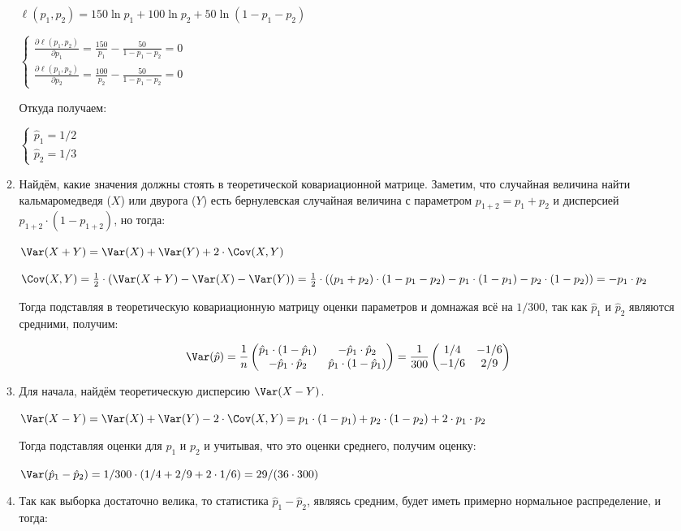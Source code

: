 \begin{enumerate}
\begin{enumerate}
$\ell(p_{1},p_{2}) = 150\ln p_{1} +100\ln p_{2}+50\ln (1-p_{1}-p_{2})$

$\begin{cases}
\frac{\partial \ell(p_{1},p_{2})}{\partial p_{1}}= \frac{150}{p_{1}} - \frac{50}{1-p_{1}-p_{2}}=0
\\
\frac{\partial \ell(p_{1},p_{2})}{\partial p_{2}}= \frac{100}{p_{2}} - \frac{50}{1-p_{1}-p_{2}}=0
\end{cases}$

Откуда получаем:

$\begin{cases}
\hat{p}_{1}=1/2
\\
\hat{p}_{2}=1/3
\end{cases}$
\item Найдём, какие значения должны стоять в теоретической ковариационной матрице.
Заметим, что случайная величина найти кальмаромедведя ($X$) или двурога ($Y$) есть бернулевская случайная величина с параметром $p_{1+2}=p_{1}+p_{2}$ и дисперсией $p_{1+2}\cdot(1-p_{1+2})$, но тогда:

$\Var(X + Y)=\Var(X)+\Var(Y)+2\cdot\Cov(X,Y)$

$\Cov(X,Y)=\frac{1}{2}\cdot(\Var(X+Y)-\Var(X)-\Var(Y))=\frac{1}{2}\cdot((p_{1}+p_{2})\cdot(1-p_{1}-p_{2})-p_{1}\cdot(1-p_{1})-p_{2}\cdot(1-p_{2}))=-p_{1}\cdot p_{2}$

Тогда подставляя в теоретическую ковариационную матрицу оценки параметров и домнажая всё на $1/300$, так как $\hat{p}_{1}$ и $\hat{p}_{2}$ являются средними, получим:

\[
\Var(\hat{p})=\frac{1}{n}\begin{pmatrix}
\hat{p}_{1}\cdot(1-\hat{p}_{1}) & -\hat{p}_{1}\cdot\hat{p}_{2}
\\
-\hat{p}_{1}\cdot\hat{p}_{2} & \hat{p}_{1}\cdot(1-\hat{p}_{1})
\end{pmatrix}=\frac{1}{300}\begin{pmatrix}
1/4 &-1/6
\\
-1/6 & 2/9
\end{pmatrix}
\]

\item Для начала, найдём теоретическую дисперсию $\Var(X-Y)$.

$\Var(X - Y)=\Var(X)+\Var(Y)-2\cdot\Cov(X,Y)=p_{1}\cdot(1-p_{1})+p_{2}\cdot(1-p_{2})+2\cdot p_{1}\cdot p_{2}$

Тогда подставляя оценки для $p_{1}$ и $p_{2}$ и учитывая, что это оценки среднего, получим оценку:

$\Var(\hat{p}_{1}-\hat{p}_{2})=1/300\cdot(1/4+2/9+2\cdot1/6)=29/(36\cdot300)$
\item
Так как выборка достаточно велика, то статистика $\hat{p}_{1}-\hat{p}_{2}$, являясь средним, будет иметь примерно нормальное распределение, и тогда:


\end{enumerate}
\end{enumerate}
